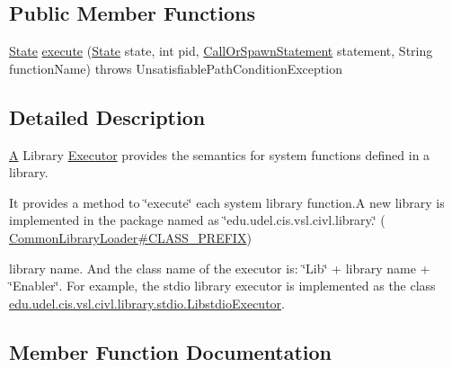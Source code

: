 \subsection*{Public Member Functions}
\begin{DoxyCompactItemize}
\item 
\hyperlink{interfaceedu_1_1udel_1_1cis_1_1vsl_1_1civl_1_1state_1_1IF_1_1State}{State} \hyperlink{interfaceedu_1_1udel_1_1cis_1_1vsl_1_1civl_1_1semantics_1_1IF_1_1LibraryExecutor_a383136ab6e875742f46b5dbd94673984}{execute} (\hyperlink{interfaceedu_1_1udel_1_1cis_1_1vsl_1_1civl_1_1state_1_1IF_1_1State}{State} state, int pid, \hyperlink{interfaceedu_1_1udel_1_1cis_1_1vsl_1_1civl_1_1model_1_1IF_1_1statement_1_1CallOrSpawnStatement}{Call\+Or\+Spawn\+Statement} statement, String function\+Name)  throws Unsatisfiable\+Path\+Condition\+Exception
\end{DoxyCompactItemize}


\subsection{Detailed Description}
\hyperlink{structA}{A} Library \hyperlink{interfaceedu_1_1udel_1_1cis_1_1vsl_1_1civl_1_1semantics_1_1IF_1_1Executor}{Executor} provides the semantics for system functions defined in a library. 

It provides a method to \char`\"{}execute\char`\"{} each system library function.\+A new library is implemented in the package named as \char`\"{}edu.\+udel.\+cis.\+vsl.\+civl.\+library.\char`\"{} ( \hyperlink{}{Common\+Library\+Loader\#\+C\+L\+A\+S\+S\+\_\+\+P\+R\+E\+F\+I\+X})
\begin{DoxyItemize}
\item library name. And the class name of the executor is\+: \char`\"{}\+Lib\char`\"{} + library name + \char`\"{}\+Enabler\char`\"{}. For example, the stdio library executor is implemented as the class \hyperlink{classedu_1_1udel_1_1cis_1_1vsl_1_1civl_1_1library_1_1stdio_1_1LibstdioExecutor}{edu.\+udel.\+cis.\+vsl.\+civl.\+library.\+stdio.\+Libstdio\+Executor}. 
\end{DoxyItemize}

\subsection{Member Function Documentation}
\hypertarget{interfaceedu_1_1udel_1_1cis_1_1vsl_1_1civl_1_1semantics_1_1IF_1_1LibraryExecutor_a383136ab6e875742f46b5dbd94673984}{}
